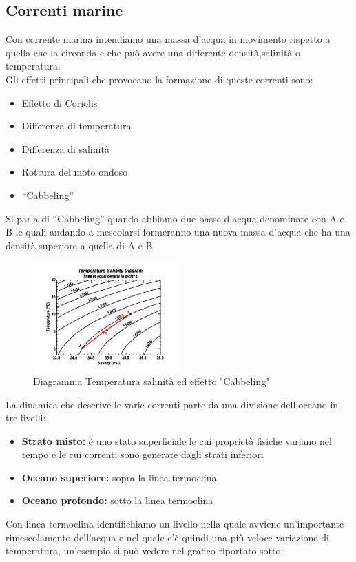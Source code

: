 \subsection{Correnti marine}
Con corrente marina intendiamo una massa d'acqua in movimento rispetto a quella che la circonda e che può avere una differente densità,salinità o temperatura.\\
Gli effetti principali che provocano la formazione di queste correnti sono:\cite{NOAA-current}
\begin{itemize}
    \item Effetto di Coriolis
    \item Differenza di temperatura
    \item Differenza di salinità
    \item Rottura del moto ondoso
    \item \enquote{Cabbeling}
\end{itemize}\noindent
Si parla di \enquote{Cabbeling} quando abbiamo due basse d'acqua denominate con A e B le quali andando a mescolarsi formeranno una nuova massa d'acqua che ha una densità superiore a quella di A e B
\begin{figure}[H]
    \centering
    \includegraphics[width=0.5\textwidth]{res/cap2/temperature-salinity}
    \caption{Diagramma Temperatura salinità ed effetto "Cabbeling"}
\end{figure}\noindent
La dinamica che descrive le varie correnti parte da una divisione dell'oceano in tre livelli:
\begin{itemize}
    \item \textbf{Strato misto:} è uno stato superficiale le cui proprietà fisiche variano nel tempo e le cui correnti sono generate dagli strati inferiori
    \item \textbf{Oceano superiore:} sopra la linea termoclina
    \item \textbf{Oceano profondo:}  sotto la linea termoclina
\end{itemize}\noindent
Con linea termoclina identifichiamo un livello nella quale avviene un'importante rimescolamento dell'acqua e nel quale c'è quindi una più veloce variazione di temperatura, un'esempio si può vedere nel grafico riportato sotto:
